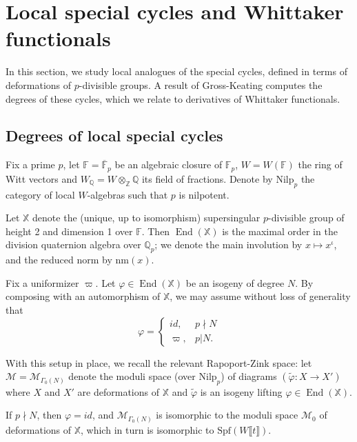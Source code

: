 \documentclass[reqno,oneside]{amsart}
\theoremstyle{plain}
\theoremstyle{remark}
\numberwithin{theorem}{section}
\newcommand{\bbF}{\mathbb F}
\newcommand{\bbQ}{\mathbb Q}
\newcommand{\bbX}{\mathbb X}
\newcommand{\bbZ}{\mathbb Z}
\newcommand{\calM}{\mathcal M}
\newcommand{\nm}{\mathrm{nm}}
\newcommand{\Nilp}{\mathrm{Nilp}}
\newcommand{\Spf}{\mathrm{Spf}}
\DeclareMathOperator{\End}{End}
\begin{document}
	
	
	
	
	\section{Local special cycles and Whittaker functionals} 	\label{sec:local}
	In this section, we study local analogues of the special cycles, defined in terms of deformations of $p$-divisible groups. A result of Gross-Keating computes the degrees of these cycles, which we relate to derivatives of Whittaker functionals.
	


	\subsection{Degrees of local special cycles}
	
	
	
	
	
	Fix a prime $p$,  let $\bbF = \overline{\bbF}_{p}$ be an algebraic closure of $\bbF_p$, $W = W(\bbF)$ the ring of Witt vectors and $W_{\bbQ} = W \otimes_{\bbZ} \bbQ$ its field of fractions. Denote by $\Nilp_{p}$ the category of local $W$-algebras such that $p$ is nilpotent.
	
	Let $\bbX$ denote the (unique, up to isomorphism) supersingular $p$-divisible group of height 2 and dimension 1 over $\bbF$. Then $\End(\bbX)$ is the maximal order in the division  quaternion  algebra over $\bbQ_{p}$; we denote the main involution by $ x \mapsto x^{\iota}$, and the reduced norm by $\nm(x)$.
	
	Fix a uniformizer $\varpi$. Let $\varphi \in \End(\bbX)$ be an isogeny of degree $N$. By composing with an automorphism of $\bbX$, we may assume without loss of generality that
	\begin{equation}
	\varphi = \begin{cases} id, & p \nmid N\\
	\varpi, & p|  N.
	\end{cases}
	\end{equation}
	
	With this setup in place, we recall the relevant Rapoport-Zink space: let $\calM = \calM_{\Gamma_0(N)}$ denote the moduli space (over $\Nilp_{p}$) of diagrams $(\tilde\varphi\colon X \to X')$ where $X$ and $X'$ are deformations of $\bbX$ and $\tilde \varphi$ is an isogeny lifting $\varphi \in \End(\bbX)$.
	
	If $p \nmid N$, then $\varphi = id$, and $\calM_{\Gamma_0(N)}$ is isomorphic to the moduli space $\calM_0$ of deformations of $\bbX$, which in turn is isomorphic to  $\Spf(W \llbracket t \rrbracket)$.
	
\end{document}
